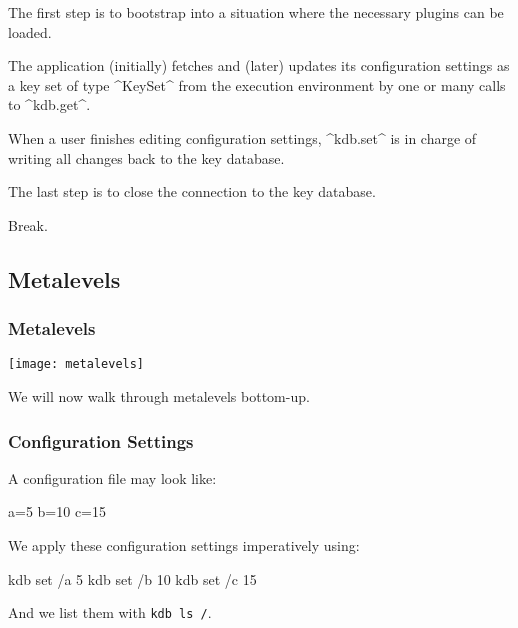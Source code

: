 \begin{frame}[fragile]
	\begin{description}[align=left]
	\item[kdb.open():]
	The first step is to bootstrap into a situation where the necessary plugins can be loaded.
	\item[kdb.get(\texttt{KeySet}):] 
	The application (initially) fetches and (later) updates its configuration settings as a key set of type ^KeySet^ from the execution environment by one or many calls to ^kdb.get^.
	\item[kdb.set(\texttt{KeySet}):] 
	When a user finishes editing configuration settings, ^kdb.set^ is in charge of writing all changes back to the key database.
	\item[kdb.close():] 
	The last step is to close the connection to the key database.
	\end{description}
\end{frame}

\begin{assignment}
	\begin{task}
	Break.
	\end{task}
\end{assignment}

\subsection{Metalevels}

\begin{frame}
	\frametitle{Metalevels}
	\texttt{[image: metalevels]}

	We will now walk through metalevels bottom-up.
\end{frame}

\begin{frame}[fragile]
	\frametitle{Configuration Settings}

	A configuration file may look like:

	\begin{code}[language=CfgElektra]
	a=5
	b=10
	c=15
	\end{code}

	We apply these configuration settings imperatively using:

	\begin{code}[language=bash]
	kdb set /a 5
	kdb set /b 10
	kdb set /c 15
	\end{code}

	And we list them with \lstinline[language=bash,morekeywords={ls},showspaces=no]^kdb ls /^.
\end{frame}

